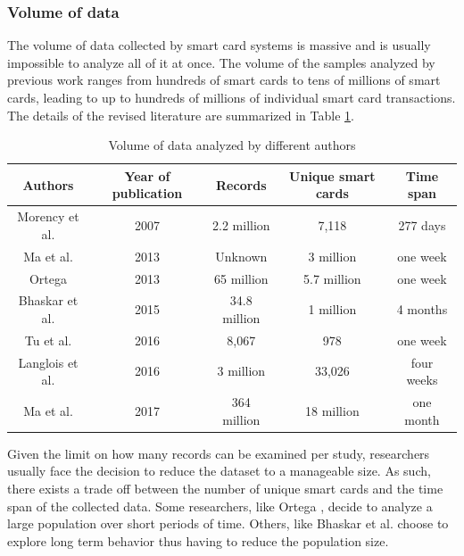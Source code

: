 \documentclass{article}
\begin{document}
\subsubsection{Volume of data}
The volume of data collected by smart card systems is massive and is usually impossible to analyze all of it at once. The volume of the samples analyzed by previous work ranges from hundreds of smart cards to tens of millions of smart cards, leading to up to hundreds of millions of individual smart card transactions. The details of the revised literature are summarized in Table \ref{table:volumeData}.
 
\begin{table}[H]
\centering
\begin{tabular}{||c c c c c||} 
 \hline
 Authors & Year of publication & Records & Unique smart cards & Time span \\ [0.5ex] 
 \hline\hline
 Morency et al. \cite{morency2007measuring} & 2007 & 2.2 million & 7,118 & 277 days \\
 Ma et al. \cite{ma2013mining} & 2013 & Unknown & 3 million & one week \\
 Ortega \cite{ortega2013classification} & 2013 & 65 million & 5.7 million & one week \\
 Bhaskar et al. \cite{bhaskar2015passenger} & 2015 & 34.8 million & 1 million & 4 months \\ %
 Tu et al. \cite{tu2016impact} & 2016 & 8,067 & 978 & one week \\ 
 Langlois et al. \cite{langlois2016inferring} & 2016 & 3 million & 33,026 & four weeks \\
 Ma et al. \cite{ma2017understanding} & 2017 & 364 million & 18 million & one month\\ [1ex] 
 \hline
\end{tabular}
\caption{Volume of data analyzed by different authors}
\label{table:volumeData}
\end{table}

Given the limit on how many records can be examined per study, researchers usually face the decision to reduce the dataset to a manageable size. As such, there exists a trade off between the number of unique smart cards and the time span of the collected data. Some researchers, like Ortega \cite{ortega2013classification}, decide to analyze a large population over short periods of time. Others, like  Bhaskar et al. \cite{bhaskar2015passenger} choose to explore long term behavior thus having to reduce the population size. 
\end{document}
